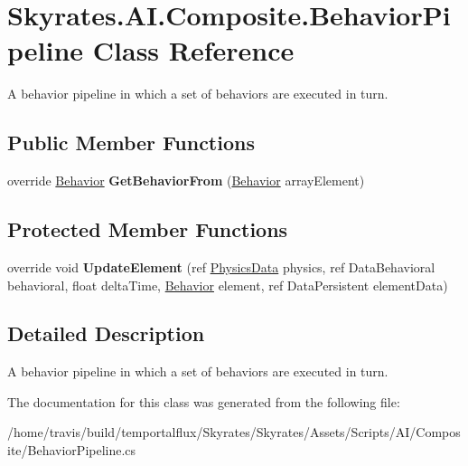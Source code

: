 \hypertarget{class_skyrates_1_1_a_i_1_1_composite_1_1_behavior_pipeline}{\section{Skyrates.\-A\-I.\-Composite.\-Behavior\-Pipeline Class Reference}
\label{class_skyrates_1_1_a_i_1_1_composite_1_1_behavior_pipeline}
}


A behavior pipeline in which a set of behaviors are executed in turn.  


\subsection*{Public Member Functions}
\begin{DoxyCompactItemize}
\item 
\hypertarget{class_skyrates_1_1_a_i_1_1_composite_1_1_behavior_pipeline_a6efc85279b5ba2f0f3d25e6e49cf55c0}{override \hyperlink{class_skyrates_1_1_a_i_1_1_behavior}{Behavior} {\bfseries Get\-Behavior\-From} (\hyperlink{class_skyrates_1_1_a_i_1_1_behavior}{Behavior} array\-Element)}\label{class_skyrates_1_1_a_i_1_1_composite_1_1_behavior_pipeline_a6efc85279b5ba2f0f3d25e6e49cf55c0}

\end{DoxyCompactItemize}
\subsection*{Protected Member Functions}
\begin{DoxyCompactItemize}
\item 
\hypertarget{class_skyrates_1_1_a_i_1_1_composite_1_1_behavior_pipeline_aeb790c96da7ca44dfbdd09de099892ef}{override void {\bfseries Update\-Element} (ref \hyperlink{class_skyrates_1_1_physics_1_1_physics_data}{Physics\-Data} physics, ref Data\-Behavioral behavioral, float delta\-Time, \hyperlink{class_skyrates_1_1_a_i_1_1_behavior}{Behavior} element, ref Data\-Persistent element\-Data)}\label{class_skyrates_1_1_a_i_1_1_composite_1_1_behavior_pipeline_aeb790c96da7ca44dfbdd09de099892ef}

\end{DoxyCompactItemize}


\subsection{Detailed Description}
A behavior pipeline in which a set of behaviors are executed in turn. 



The documentation for this class was generated from the following file\-:\begin{DoxyCompactItemize}
\item 
/home/travis/build/temportalflux/\-Skyrates/\-Skyrates/\-Assets/\-Scripts/\-A\-I/\-Composite/Behavior\-Pipeline.\-cs\end{DoxyCompactItemize}
